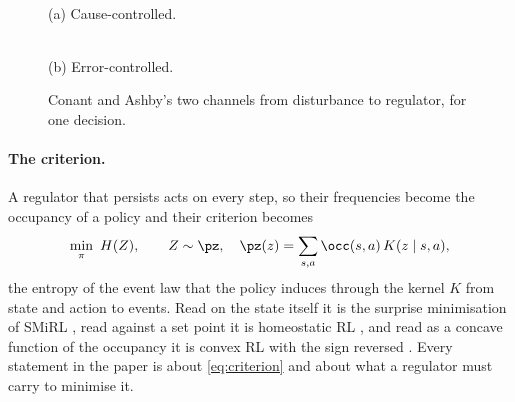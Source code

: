 \begin{figure}[h]
\centering
{}
\begin{minipage}{0.45\textwidth}
\centering
{}\\[1mm]
{\small (a) Cause-controlled.}
\end{minipage}\hfill
\begin{minipage}{0.45\textwidth}
\centering
{}\\[1mm]
{\small (b) Error-controlled.}
\end{minipage}
\caption{Conant and Ashby's two channels from disturbance to regulator, for one decision.}
\label{fig:oneshot}
\end{figure}

\paragraph{The criterion.}
A regulator that persists acts on every step, so their frequencies become the occupancy of a policy and their criterion becomes
\begin{equation}
  \min_\pi\ H(Z), \qquad Z \sim \pz, \quad \pz(z) = \sum_{s,a} \occ(s,a)\, K(z \mid s,a),
  \label{eq:criterion}
\end{equation}
the entropy of the event law that the policy induces through the kernel $K$ from state and action to events.
Read on the state itself it is the surprise minimisation of SMiRL \citep{Berseth-smirl21}, read against a set point it is homeostatic RL \citep{Keramati-homeostatic14}, and read as a concave function of the occupancy it is convex RL with the sign reversed \citep{Zahavy-reward21,Hazan-provably19,Mutti-convex23}.
Every statement in the paper is about \eqref{eq:criterion} and about what a regulator must carry to minimise it.

